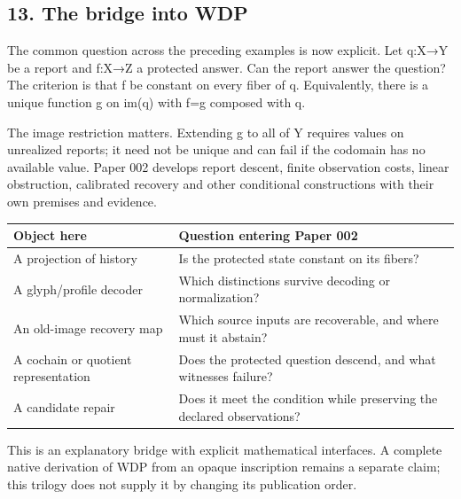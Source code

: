 \documentclass[
  11pt,
]{article}
\begin{document}
\subsection{13. The bridge into WDP}\label{the-bridge-into-wdp}

The common question across the preceding examples is now explicit. Let
q:X→Y be a report and f:X→Z a protected answer. Can the report answer
the question? The criterion is that f be constant on every fiber of q.
Equivalently, there is a unique function g on im(q) with f=g composed
with q.

The image restriction matters. Extending g to all of Y requires values
on unrealized reports; it need not be unique and can fail if the
codomain has no available value. Paper 002 develops report descent,
finite observation costs, linear obstruction, calibrated recovery and
other conditional constructions with their own premises and evidence.

\begin{longtable}[]{@{}
  >{\raggedright\arraybackslash}p{}
  >{\raggedright\arraybackslash}p{}@{}}
\toprule\noalign{}
\begin{minipage}[b]{\linewidth}\raggedright
Object here
\end{minipage} & \begin{minipage}[b]{\linewidth}\raggedright
Question entering Paper 002
\end{minipage} \\
\midrule\noalign{}
\endhead
\bottomrule\noalign{}
\endlastfoot
A projection of history & Is the protected state constant on its
fibers? \\
A glyph/profile decoder & Which distinctions survive decoding or
normalization? \\
An old-image recovery map & Which source inputs are recoverable, and
where must it abstain? \\
A cochain or quotient representation & Does the protected question
descend, and what witnesses failure? \\
A candidate repair & Does it meet the condition while preserving the
declared observations? \\
\end{longtable}

This is an explanatory bridge with explicit mathematical interfaces. A
complete native derivation of WDP from an opaque inscription remains a
separate claim; this trilogy does not supply it by changing its
publication order.
\end{document}
